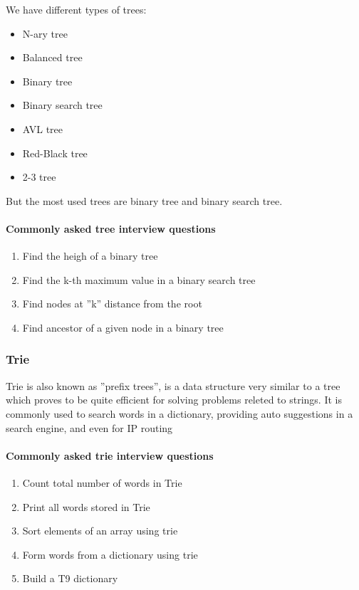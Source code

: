 We have different types of trees:
\begin{itemize}
    \item { N-ary tree }
    \item { Balanced tree }
    \item { Binary tree }
    \item { Binary search tree }
    \item { AVL tree }
    \item { Red-Black tree }
    \item { 2-3 tree }
\end{itemize}

But the most used trees are binary tree and binary search tree.

\paragraph{Commonly asked tree interview questions}
\begin{enumerate}
    \item { Find the heigh of a binary tree }
    \item { Find the k-th maximum value in a binary search tree }
    \item { Find nodes at ''k'' distance from the root }
    \item { Find ancestor of a given node in a binary tree }
\end{enumerate}

\subsubsection{Trie}
Trie is also known as ''prefix trees'', is a data structure very similar to a tree which proves to be quite efficient for solving problems releted to strings. It is commonly used to search words in a dictionary, providing auto suggestions in a search engine, and even for IP routing

\paragraph{Commonly asked trie interview questions}
\begin{enumerate}
    \item { Count total number of words in Trie }
    \item { Print all words stored in Trie }
    \item { Sort elements of an array using trie }
    \item { Form words from a dictionary using trie } 
    \item { Build a T9 dictionary }
\end{enumerate}

